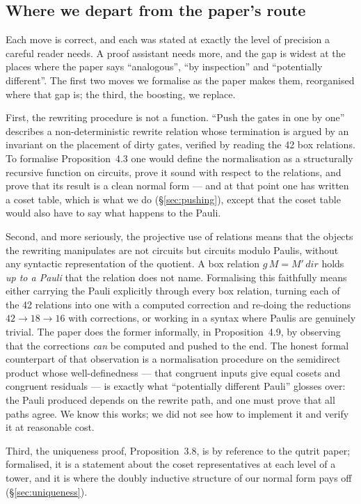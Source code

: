 \subsection{Where we depart from the paper's route}

Each move is correct, and each was stated at exactly the level of
precision a careful reader needs.  A proof assistant needs more, and the
gap is widest at the places where the paper says ``analogous'', ``by
inspection'' and ``potentially different''.  The first two moves we
formalise as the paper makes them, reorganised where that gap is; the
third, the boosting, we replace.

First, the rewriting procedure is not a function.  ``Push the gates in
one by one'' describes a non-deterministic rewrite relation whose
termination is argued by an invariant on the placement of dirty gates,
verified by reading the 42 box relations.  To formalise Proposition~4.3
one would define the normalisation as a structurally recursive function
on circuits, prove it sound with respect to the relations, and prove
that its result is a clean normal form --- and at that point one has
written a coset table, which is what we do (\S\ref{sec:pushing}), except
that the coset table would also have to say what happens to the Pauli.

Second, and more seriously, the projective use of relations means that
the objects the rewriting manipulates are not circuits but circuits
modulo Paulis, without any syntactic representation of the quotient.  A
box relation $g\,M = M'\,\mathit{dir}$ holds \emph{up to a Pauli} that
the relation does not name.  Formalising this faithfully means either
carrying the Pauli explicitly through every box relation, turning each
of the 42 relations into one with a computed correction and re-doing the
reductions $42 \to 18 \to 16$ with corrections, or working in a syntax
where Paulis are genuinely trivial.  The paper does the former
informally, in Proposition~4.9, by observing that the corrections
\emph{can} be computed and pushed to the end.  The honest formal
counterpart of that observation is a normalisation procedure on the
semidirect product whose well-definedness --- that congruent inputs give
equal cosets and congruent residuals --- is exactly what ``potentially
different Pauli'' glosses over: the Pauli produced depends on the
rewrite path, and one must prove that all paths agree.  We know this
works; we did not see how to implement it and verify it at reasonable
cost.

Third, the uniqueness proof, Proposition~3.8, is by reference to the
qutrit paper; formalised, it is a statement about the coset
representatives at each level of a tower, and it is where the doubly
inductive structure of our normal form pays off
(\S\ref{sec:uniqueness}).

